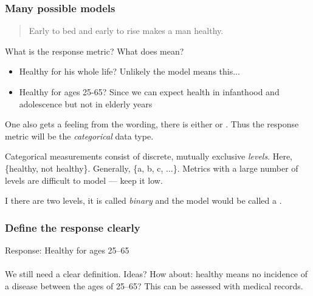 \documentclass[slides]{beamer} %
\begin{document}
\begin{frame}\frametitle{Many possible models}

\small
\begin{quotation}
Early to bed and early to rise makes a man healthy.
\end{quotation}

What is the response metric? \pause What does  mean?\\

\begin{itemize}
\item Healthy for his whole life? Unlikely the model means this...
\item Healthy for ages 25-65? Since we can expect health in infanthood and adolescence but not in elderly years
\end{itemize}

One also gets a feeling from the wording, there is either  or . Thus the response metric will be the \textit{categorical} data type. \\\vspace{0.2cm}

Categorical measurements consist of discrete, mutually exclusive \textit{levels}. Here, \{healthy, not healthy\}. Generally, \{a, b, c, $\ldots$\}. Metrics with a large number of levels are difficult to model --- keep it low.\\\vspace{0.2cm}

I there are two levels, it is called \textit{binary} and the model would be called a .
	
\end{frame}

\begin{frame}\frametitle{Define the response clearly}

Response: Healthy for ages 25--65 \\~\\

We still need a clear definition. Ideas? How about: healthy means no incidence of a  disease between the ages of 25--65? This can be assessed with medical records. 
	
\end{frame}
\end{document}
